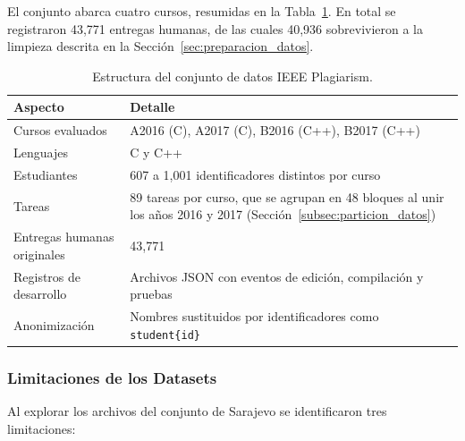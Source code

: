 El conjunto abarca cuatro cursos, resumidas en la Tabla~\ref{tab:dimensiones_dataset_ieee}. En total se registraron 43,771 entregas humanas, de las cuales 40,936 sobrevivieron a la limpieza descrita en la Sección~\ref{sec:preparacion_datos}.

\begin{table}[H]
    \centering
    \caption{Estructura del conjunto de datos IEEE Plagiarism.}
    \label{tab:dimensiones_dataset_ieee}
    \begin{tabularx}{\textwidth}{|l|X|}
        \hline
        \textbf{Aspecto} & \textbf{Detalle} \\ \hline
        Cursos evaluados & A2016 (C), A2017 (C), B2016 (C++), B2017 (C++) \\ \hline
        Lenguajes & C y C++ \\ \hline
        Estudiantes & 607 a 1,001 identificadores distintos por curso \\ \hline
        Tareas & 89 tareas por curso, que se agrupan en 48 bloques al unir los años 2016 y 2017 (Sección~\ref{subsec:particion_datos}) \\ \hline
        Entregas humanas originales & 43,771 \\ \hline
        Registros de desarrollo & Archivos JSON con eventos de edición, compilación y pruebas \\ \hline
        Anonimización & Nombres sustituidos por identificadores como \texttt{student\{id\}} \\ \hline
    \end{tabularx}
\end{table}


\subsubsection{Limitaciones de los Datasets}
\label{subsec:limitaciones_dataset}

Al explorar los archivos del conjunto de Sarajevo se identificaron tres limitaciones:

